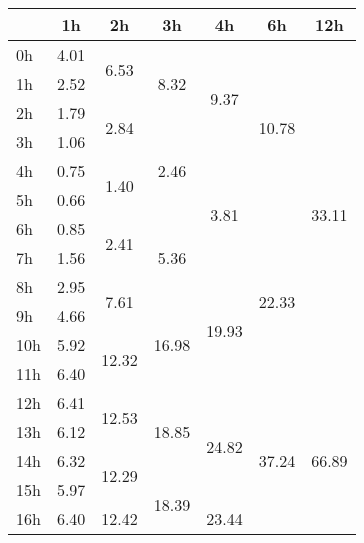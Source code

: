 \begin{center}
\begin{tabular}{| l || c | c | c | c | c | c |}\hline
 & 1h & 2h & 3h & 4h & 6h & 12h \\\hline
0h & \multirow{1}{*}{ 4.01 }  & \multirow{2}{*}{ 6.53 }  & \multirow{3}{*}{ 8.32 }  & \multirow{4}{*}{ 9.37 }  & \multirow{6}{*}{ 10.78 }  & \multirow{12}{*}{ 33.11 }  \\\cline{2-2}
1h & \multirow{1}{*}{ 2.52 }  & & & & & \\\cline{2-2}\cline{3-3}
2h & \multirow{1}{*}{ 1.79 }  & \multirow{2}{*}{ 2.84 }  & & & & \\\cline{2-2}\cline{4-4}
3h & \multirow{1}{*}{ 1.06 }  & & \multirow{3}{*}{ 2.46 }  & & & \\\cline{2-2}\cline{3-3}\cline{5-5}
4h & \multirow{1}{*}{ 0.75 }  & \multirow{2}{*}{ 1.40 }  & & \multirow{4}{*}{ 3.81 }  & & \\\cline{2-2}
5h & \multirow{1}{*}{ 0.66 }  & & & & & \\\cline{2-2}\cline{3-3}\cline{4-4}\cline{6-6}
6h & \multirow{1}{*}{ 0.85 }  & \multirow{2}{*}{ 2.41 }  & \multirow{3}{*}{ 5.36 }  & & \multirow{6}{*}{ 22.33 }  & \\\cline{2-2}
7h & \multirow{1}{*}{ 1.56 }  & & & & & \\\cline{2-2}\cline{3-3}\cline{5-5}
8h & \multirow{1}{*}{ 2.95 }  & \multirow{2}{*}{ 7.61 }  & & \multirow{4}{*}{ 19.93 }  & & \\\cline{2-2}\cline{4-4}
9h & \multirow{1}{*}{ 4.66 }  & & \multirow{3}{*}{ 16.98 }  & & & \\\cline{2-2}\cline{3-3}
10h & \multirow{1}{*}{ 5.92 }  & \multirow{2}{*}{ 12.32 }  & & & & \\\cline{2-2}
11h & \multirow{1}{*}{ 6.40 }  & & & & & \\\cline{2-2}\cline{3-3}\cline{4-4}\cline{5-5}\cline{6-6}\cline{7-7}
12h & \multirow{1}{*}{ 6.41 }  & \multirow{2}{*}{ 12.53 }  & \multirow{3}{*}{ 18.85 }  & \multirow{4}{*}{ 24.82 }  & \multirow{6}{*}{ 37.24 }  & \multirow{12}{*}{ 66.89 }  \\\cline{2-2}
13h & \multirow{1}{*}{ 6.12 }  & & & & & \\\cline{2-2}\cline{3-3}
14h & \multirow{1}{*}{ 6.32 }  & \multirow{2}{*}{ 12.29 }  & & & & \\\cline{2-2}\cline{4-4}
15h & \multirow{1}{*}{ 5.97 }  & & \multirow{3}{*}{ 18.39 }  & & & \\\cline{2-2}\cline{3-3}\cline{5-5}
16h & \multirow{1}{*}{ 6.40 }  & \multirow{2}{*}{ 12.42 }  & & \multirow{4}{*}{ 23.44 }  & & \\\cline{2-2}

\end{tabular}
\end{center}
